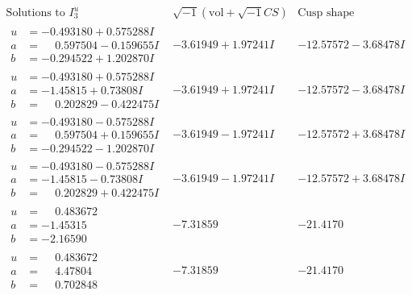 \documentclass[1p]{elsarticle_modified}
\theoremstyle{definition}
\newcommand{\I}{\sqrt{-1}}
\begin{document}
$$\begin{array}{c|c|c}  
\text{Solutions to }I^u_{3}& \I (\text{vol} + \sqrt{-1}CS) & \text{Cusp shape}\\
 \hline 
\begin{aligned}
u &= -0.493180 + 0.575288 I \\
a &= \phantom{-}0.597504 - 0.159655 I \\
b &= -0.294522 + 1.202870 I\end{aligned}
 & -3.61949 + 1.97241 I & -12.57572 - 3.68478 I \\ \hline\begin{aligned}
u &= -0.493180 + 0.575288 I \\
a &= -1.45815 + 0.73808 I \\
b &= \phantom{-}0.202829 - 0.422475 I\end{aligned}
 & -3.61949 + 1.97241 I & -12.57572 - 3.68478 I \\ \hline\begin{aligned}
u &= -0.493180 - 0.575288 I \\
a &= \phantom{-}0.597504 + 0.159655 I \\
b &= -0.294522 - 1.202870 I\end{aligned}
 & -3.61949 - 1.97241 I & -12.57572 + 3.68478 I \\ \hline\begin{aligned}
u &= -0.493180 - 0.575288 I \\
a &= -1.45815 - 0.73808 I \\
b &= \phantom{-}0.202829 + 0.422475 I\end{aligned}
 & -3.61949 - 1.97241 I & -12.57572 + 3.68478 I \\ \hline\begin{aligned}
u &= \phantom{-}0.483672\phantom{ +0.000000I} \\
a &= -1.45315\phantom{ +0.000000I} \\
b &= -2.16590\phantom{ +0.000000I}\end{aligned}
 & -7.31859\phantom{ +0.000000I} & -21.4170\phantom{ +0.000000I} \\ \hline\begin{aligned}
u &= \phantom{-}0.483672\phantom{ +0.000000I} \\
a &= \phantom{-}4.47804\phantom{ +0.000000I} \\
b &= \phantom{-}0.702848\phantom{ +0.000000I}\end{aligned}
 & -7.31859\phantom{ +0.000000I} & -21.4170\phantom{ +0.000000I} \\ \hline\begin{aligned}

\end{aligned}
\end{array}$$
\end{document}
